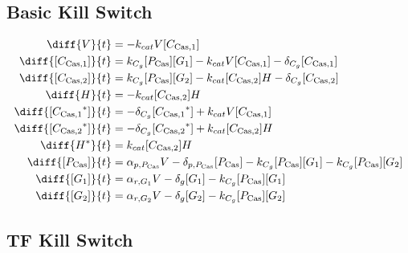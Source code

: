 \subsection{Basic Kill Switch}
\label{s:Basic_kill_switch}

\begin{align}
\diff{\vectorGen{}}{t} & = - \casCutRate{{}}\vectorGen{}\conc{\cplx{\cas}{1}}\\ 
\diff{\conc{\cplx{\cas}{1}}}{t} & =  \gRnaBind{}\conc{\proSp{\cas{}}}\conc{\gRna{1}} - \casCutRate{{}}\vectorGen{}\conc{\cplx{\cas}{1}} - \casCompDegradeRate{}\conc{\cplx{\cas}{1}}\\ 
\diff{\conc{\cplx{\cas}{2}}}{t} & =  \gRnaBind{}\conc{\proSp{\cas{}}}\conc{\gRna{2}} - \casCutRate{{}}\conc{\cplx{\cas}{2}}\hostGen{} - \casCompDegradeRate{}\conc{\cplx{\cas}{2}}\\ 
\diff{\hostGen{}}{t} & = - \casCutRate{{}}\conc{\cplx{\cas}{2}}\hostGen{}\\ 
\diff{\conc{\bound{\cplx{\cas}{1}}}}{t} & = - \casCompDegradeRate{}\conc{\bound{\cplx{\cas}{1}}} + \casCutRate{{}}\vectorGen{}\conc{\cplx{\cas}{1}}\\ 
\diff{\conc{\bound{\cplx{\cas}{2}}}}{t} & = - \casCompDegradeRate{}\conc{\bound{\cplx{\cas}{2}}} + \casCutRate{{}}\conc{\cplx{\cas}{2}}\hostGen{}\\ 
\diff{\edited{\hostGen{}}}{t} & =  \casCutRate{{}}\conc{\cplx{\cas}{2}}\hostGen{}\\ 
\diff{\conc{\proSp{\cas{}}}}{t} & =  \txtlRate{\proSp{\cas{}}}\vectorGen{} - \proDegradeRate{\proSp{\cas{}}}\conc{\proSp{\cas{}}} - \gRnaBind{}\conc{\proSp{\cas{}}}\conc{\gRna{1}} - \gRnaBind{}\conc{\proSp{\cas{}}}\conc{\gRna{2}}\\ 
\diff{\conc{\gRna{1}}}{t} & =  \txRate{\gRna{1}}\vectorGen{} - \rnaDegradeRate{}\conc{\gRna{1}} - \gRnaBind{}\conc{\proSp{\cas{}}}\conc{\gRna{1}}\\ 
\diff{\conc{\gRna{2}}}{t} & =  \txRate{\gRna{2}}\vectorGen{} - \rnaDegradeRate{}\conc{\gRna{2}} - \gRnaBind{}\conc{\proSp{\cas{}}}\conc{\gRna{2}}
\end{align}

\subsection{TF Kill Switch}
\label{s:TF_delayed_kill_switch}

